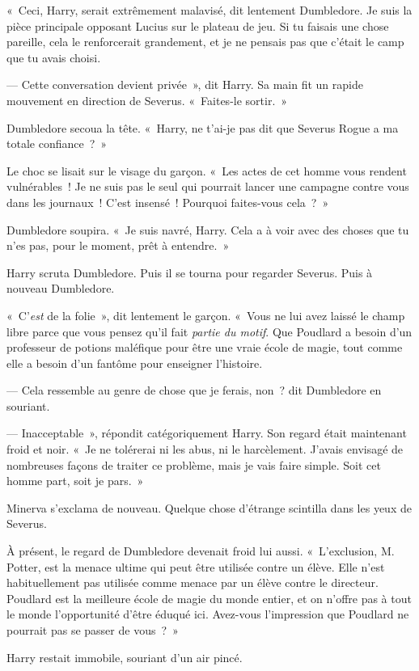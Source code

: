 «~Ceci, Harry, serait extrêmement malavisé, dit lentement Dumbledore.
Je suis la pièce principale opposant Lucius sur le plateau de jeu.
Si tu faisais une chose pareille, cela le renforcerait grandement, et je ne pensais pas que c'était le camp que tu avais choisi.

--- Cette conversation devient privée~», dit Harry.
Sa main fit un rapide mouvement en direction de Severus.
«~Faites-le sortir.~»

Dumbledore secoua la tête.
«~Harry, ne t'ai-je pas dit que Severus Rogue a ma totale confiance~?~»

Le choc se lisait sur le visage du garçon.
«~Les actes de cet homme vous rendent vulnérables~!
Je ne suis pas le seul qui pourrait lancer une campagne contre vous dans les journaux~!
C'est insensé~!
Pourquoi faites-vous cela~?~»

Dumbledore soupira.
«~Je suis navré, Harry.
Cela a à voir avec des choses que tu n'es pas, pour le moment, prêt à entendre.~»

Harry scruta Dumbledore.
Puis il se tourna pour regarder Severus.
Puis à nouveau Dumbledore.

«~C'\emph{est} de la folie~», dit lentement le garçon.
«~Vous ne lui avez laissé le champ libre parce que vous pensez qu'il fait \emph{partie du motif}.
Que Poudlard a besoin d'un professeur de potions maléfique pour être une vraie école de magie, tout comme elle a besoin d'un fantôme pour enseigner l'histoire.

--- Cela ressemble au genre de chose que je ferais, non~? dit Dumbledore en souriant.

--- Inacceptable~», répondit catégoriquement Harry.
Son regard était maintenant froid et noir.
«~Je ne tolérerai ni les abus, ni le harcèlement.
J'avais envisagé de nombreuses façons de traiter ce problème, mais je vais faire simple.
Soit cet homme part, soit je pars.~»

Minerva s'exclama de nouveau.
Quelque chose d'étrange scintilla dans les yeux de Severus.

À présent, le regard de Dumbledore devenait froid lui aussi.
«~L'exclusion, M. Potter, est la menace ultime qui peut être utilisée contre un élève.
Elle n'est habituellement pas utilisée comme menace par un élève contre le directeur.
Poudlard est la meilleure école de magie du monde entier, et on n'offre pas à tout le monde l'opportunité d'être éduqué ici.
Avez-vous l'impression que Poudlard ne pourrait pas se passer de vous~?~»

Harry restait immobile, souriant d'un air pincé.

